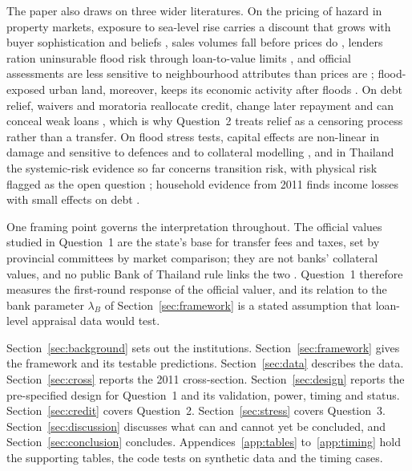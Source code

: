 The paper also draws on three wider literatures. On the pricing of hazard in property markets, exposure to sea-level rise carries a discount that grows with buyer sophistication and beliefs \citep{bernstein2019disaster,baldauf2020does}, sales volumes fall before prices do \citep{keys2020neglected}, lenders ration uninsurable flood risk through loan-to-value limits \citep{sastry2026who}, and official assessments are less sensitive to neighbourhood attributes than prices are \citep{avenancioleon2022assessment}; flood-exposed urban land, moreover, keeps its economic activity after floods \citep{kocornikmina2020flooded}. On debt relief, waivers and moratoria reallocate credit, change later repayment and can conceal weak loans \citep{gine2018economic,mukherjee2018borrowers,dinerstein2024debt,kim2024intermediation,chari2021unholy}, which is why Question~2 treats relief as a censoring process rather than a transfer. On flood stress tests, capital effects are non-linear in damage and sensitive to defences and to collateral modelling \citep{lepore2024beyond,dhima2026integration}, and in Thailand the systemic-risk evidence so far concerns transition risk, with physical risk flagged as the open question \citep{luangaram2024climate}; household evidence from 2011 finds income losses with small effects on debt \citep{noy2021floods}.

One framing point governs the interpretation throughout. The official values studied in Question~1 are the state's base for transfer fees and taxes, set by provincial committees by market comparison; they are not banks' collateral values, and no public Bank of Thailand rule links the two \citep{th2020appraisalmr,bot2019collateral}. Question~1 therefore measures the first-round response of the official valuer, and its relation to the bank parameter $\lambda_B$ of Section~\ref{sec:framework} is a stated assumption that loan-level appraisal data would test.

Section~\ref{sec:background} sets out the institutions. Section~\ref{sec:framework} gives the framework and its testable predictions. Section~\ref{sec:data} describes the data. Section~\ref{sec:cross} reports the 2011 cross-section. Section~\ref{sec:design} reports the pre-specified design for Question~1 and its validation, power, timing and status. Section~\ref{sec:credit} covers Question~2. Section~\ref{sec:stress} covers Question~3. Section~\ref{sec:discussion} discusses what can and cannot yet be concluded, and Section~\ref{sec:conclusion} concludes. Appendices~\ref{app:tables} to~\ref{app:timing} hold the supporting tables, the code tests on synthetic data and the timing cases.

